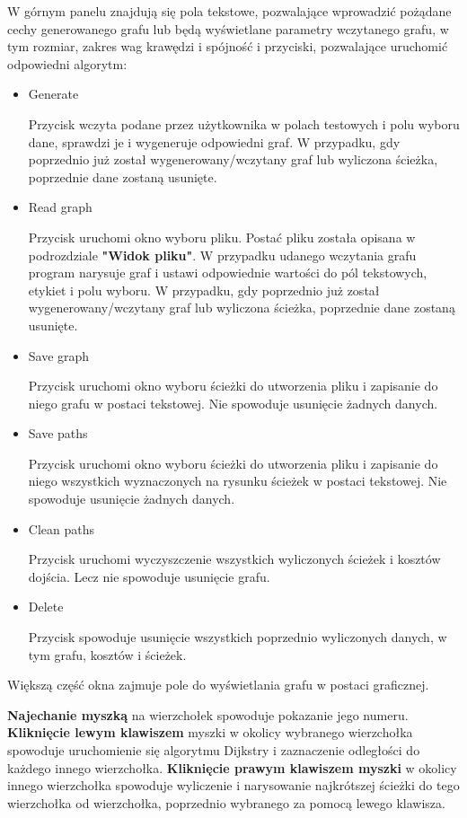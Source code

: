 \documentclass[]{article}
\begin{document}
W górnym panelu znajdują się pola tekstowe, pozwalające wprowadzić pożądane cechy generowanego grafu lub będą wyświetlane parametry wczytanego grafu, w tym rozmiar, zakres wag krawędzi i spójność i przyciski, pozwalające uruchomić odpowiedni algorytm:
\begin{itemize}
    \item Generate
    
    Przycisk wczyta podane przez użytkownika w polach testowych i polu wyboru dane, sprawdzi je i wygeneruje odpowiedni graf. W przypadku, gdy poprzednio już został wygenerowany/wczytany graf lub wyliczona ścieżka, poprzednie dane zostaną usunięte.
    
    \item Read graph
    
    Przycisk uruchomi okno wyboru pliku. Postać pliku została opisana w podrozdziale \textbf{"Widok pliku"}. W przypadku udanego wczytania grafu program narysuje graf i ustawi odpowiednie wartości do pól tekstowych, etykiet i polu wyboru. W przypadku, gdy poprzednio już został wygenerowany/wczytany graf lub wyliczona ścieżka, poprzednie dane zostaną usunięte.
    
    \item Save graph
    
    Przycisk uruchomi okno wyboru ścieżki do utworzenia pliku i zapisanie do niego grafu w postaci tekstowej. Nie spowoduje usunięcie żadnych danych.
    \item Save paths
    
    Przycisk uruchomi okno wyboru ścieżki do utworzenia pliku i zapisanie do niego wszystkich wyznaczonych na rysunku ścieżek w postaci tekstowej. Nie spowoduje usunięcie żadnych danych.
    \item Clean paths
    
    Przycisk uruchomi wyczyszczenie wszystkich wyliczonych ścieżek i kosztów dojścia. Lecz nie spowoduje usunięcie grafu.
    \item Delete
    
    Przycisk spowoduje usunięcie wszystkich poprzednio wyliczonych danych, w tym grafu, kosztów i ścieżek.
\end{itemize}


Większą część okna zajmuje pole do wyświetlania grafu w postaci graficznej. 

\textbf{Najechanie myszką} na wierzchołek spowoduje pokazanie jego numeru. \textbf{Kliknięcie lewym klawiszem} myszki w okolicy wybranego wierzchołka spowoduje uruchomienie się algorytmu Dijkstry i zaznaczenie odległości do każdego innego wierzchołka. \textbf{Kliknięcie prawym klawiszem myszki} w okolicy innego wierzchołka spowoduje wyliczenie i narysowanie najkrótszej ścieżki do tego wierzchołka od wierzchołka, poprzednio wybranego za pomocą lewego klawisza.
\end{document}
